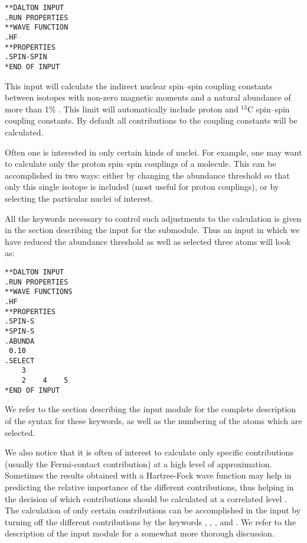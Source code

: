 \begin{verbatim}
**DALTON INPUT
.RUN PROPERTIES
**WAVE FUNCTION
.HF
**PROPERTIES
.SPIN-SPIN
*END OF INPUT
\end{verbatim}

This input will calculate the indirect nuclear spin--spin
coupling
constants between isotopes with non-zero magnetic
moments and a
natural abundance of more than 1\% . This limit will
automatically 
include proton and $^{13}$C spin--spin coupling constants. By default
all contributions to the coupling constants will be calculated. 

Often one is interested in only certain kinds of nuclei. For example,
 one may want to calculate only the proton spin--spin couplings of a molecule.
This can be accomplished in two ways: either by changing the abundance
threshold so that only this single isotope is included (most useful
for proton couplings), or by selecting the particular nuclei of interest. 

All the keywords necessary to control such adjustments to the
calculation is given in the section describing the input for the
 submodule. Thus an input 
in which we  have reduced the abundance threshold as well as
selected three atoms will look as:

\begin{verbatim}
**DALTON INPUT
.RUN PROPERTIES
**WAVE FUNCTIONS
.HF
**PROPERTIES
.SPIN-S
*SPIN-S
.ABUNDA
 0.10
.SELECT
    3
    2    4    5
*END OF INPUT
\end{verbatim}

We refer to the section describing the  input module for
the complete description of the syntax for these keywords, as well as
the numbering of the atoms which are selected.

We also notice that it is often of interest to calculate only specific
contributions (usually the Fermi-contact contribution) at a high level
of approximation. Sometimes the results obtained with a Hartree-Fock
wave function may help in predicting the relative importance of the different
contributions, thus helping in the decision of which contributions
should be calculated at a correlated level \cite{krthklbpjcpl226}.
The calculation of only certain contributions can be accomplished in
the input by turning off the different 
contributions by the keywords , ,
, and . We refer to the description of the
 input module for a somewhat more thorough discussion.

